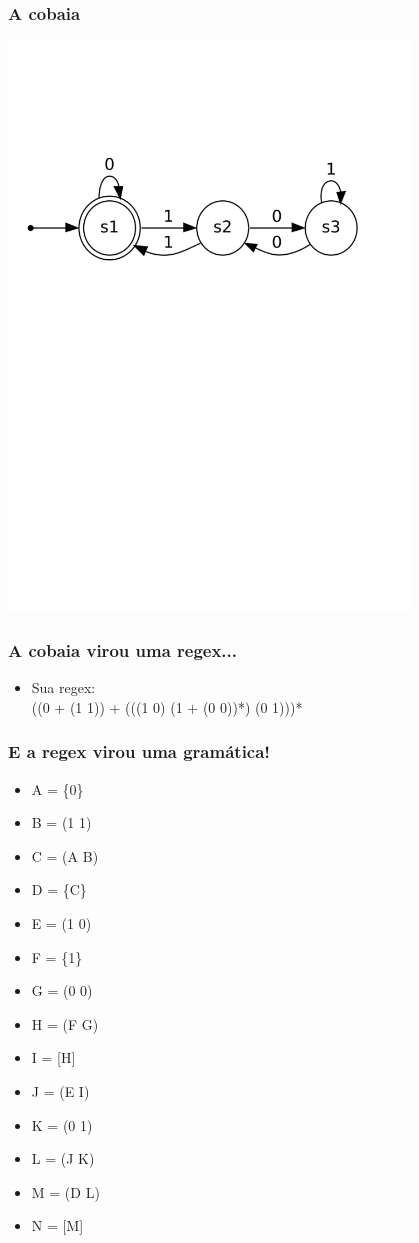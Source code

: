 \documentclass{beamer}
\begin{document}
\begin{frame}[fragile]
  \frametitle{A cobaia}
  \begin{center}
    \includegraphics[width=0.8\textwidth]{output.png}
  \end{center}
\end{frame}

\begin{frame}[fragile]
  \frametitle{A cobaia virou uma regex...}
  \begin{itemize}
  \item Sua regex:\\
    ((0 + (1 1)) + (((1 0) (1 + (0 0))*) (0 1)))*
  \end{itemize}
\end{frame}

\begin{frame}[fragile]
  \frametitle{E a regex virou uma gram\'atica!}
  \begin{itemize}
  \item A = \{0\}
  \item B = (1 1)
  \item C = (A B)
  \item D = \{C\}
  \item E = (1 0)
  \item F = \{1\}
  \item G = (0 0)
  \item H = (F G)
  \item I = [H]
  \item J = (E I)
  \item K = (0 1)
  \item L = (J K)
  \item M = (D L)
  \item N = [M]
  \end{itemize}
\end{frame}
\end{document}
